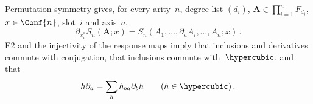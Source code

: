 Permutation symmetry gives, for every arity~$n$, degree list $(d_i)$, $\boldsymbol A\in\prod_{i=1}^nF_{d_i}$, $x\in\Conf{n}$, slot~$i$ and axis~$a$,
\begin{equation*}
\partial_{x_i^a}S_n(\boldsymbol A;x)=S_n(A_1,\ldots,\partial_aA_i,\ldots,A_n;x)\,.
\end{equation*}
E2 and the injectivity of the response maps imply that inclusions and derivatives commute with conjugation, that inclusions commute with~$\hypercubic$, and that
\begin{equation*}
h\partial_a=\sum_bh_{ba}\partial_bh\qquad(h\in\hypercubic)\,.
\end{equation*}
